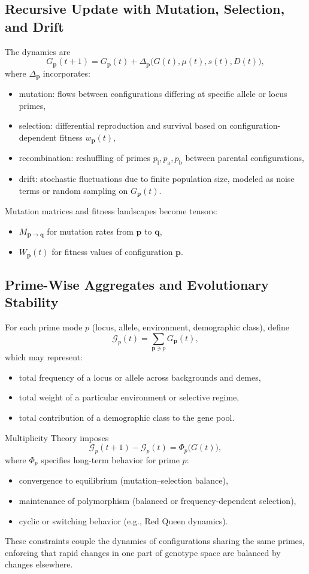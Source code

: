 \documentclass[11pt]{article}
\begin{document}
\subsection{Recursive Update with Mutation, Selection, and Drift}
The dynamics are
\[
G_{\mathbf{p}}(t+1)
=
G_{\mathbf{p}}(t)
+
\Delta_{\mathbf{p}}\big(G(t), \mu(t), s(t), D(t)\big),
\]
where $\Delta_{\mathbf{p}}$ incorporates:
\begin{itemize}
    \item mutation: flows between configurations differing at specific allele or locus primes,
    \item selection: differential reproduction and survival based on configuration-dependent fitness $w_{\mathbf{p}}(t)$,
    \item recombination: reshuffling of primes $p_{\text{l}}, p_{\text{a}}, p_{\text{b}}$ between parental configurations,
    \item drift: stochastic fluctuations due to finite population size, modeled as noise terms or random sampling on $G_{\mathbf{p}}(t)$.
\end{itemize}
Mutation matrices and fitness landscapes become tensors:
\begin{itemize}
    \item $M_{\mathbf{p} \to \mathbf{q}}$ for mutation rates from $\mathbf{p}$ to $\mathbf{q}$,
    \item $W_{\mathbf{p}}(t)$ for fitness values of configuration $\mathbf{p}$.
\end{itemize}

\subsection{Prime-Wise Aggregates and Evolutionary Stability}
For each prime mode $p$ (locus, allele, environment, demographic class), define
\[
\mathcal{G}_p(t)
=
\sum_{\mathbf{p} \ni p} G_{\mathbf{p}}(t),
\]
which may represent:
\begin{itemize}
    \item total frequency of a locus or allele across backgrounds and demes,
    \item total weight of a particular environment or selective regime,
    \item total contribution of a demographic class to the gene pool.
\end{itemize}
Multiplicity Theory imposes
\[
\mathcal{G}_p(t+1) - \mathcal{G}_p(t)
=
\Phi_p\big(G(t)\big),
\]
where $\Phi_p$ specifies long-term behavior for prime $p$:
\begin{itemize}
    \item convergence to equilibrium (mutation--selection balance),
    \item maintenance of polymorphism (balanced or frequency-dependent selection),
    \item cyclic or switching behavior (e.g., Red Queen dynamics).
\end{itemize}
These constraints couple the dynamics of configurations sharing the same primes, enforcing that rapid changes in one part of genotype space are balanced by changes elsewhere.
\end{document}
